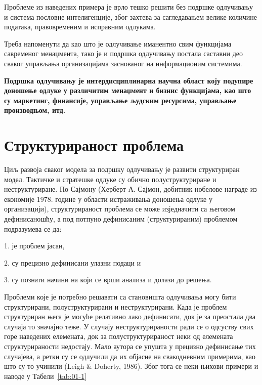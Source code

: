Проблеме из наведених примера је врло тешко решити без подршке одлучивању и система пословне интелигенције, због захтева за сагледавањем велике количине података, правовременим и исправним одлукама.

Треба напоменути да као што је одлучивање иманентно свим функцијама савременог менаџмента, тако је и подршка одлучивању постала саставни део сваког управљања организацијама заснованог на информационим системима.

\textbf{Подршка одлучивању је интердисциплинарна научна област коју подупире доношење одлуке у различитим менаџмент и бизнис функцијама, као што су маркетинг, финансије, управљање људским ресурсима, управљање производњом, итд.}

\section{Структурираност проблема}
Циљ развоја сваког модела за подршку одлучивању је развити структуриран модел. Тактичке и стратешке одлуке су обично полуструктуриране и неструктуриране. По Сајмону (Херберт А. Сајмон, добитник нобелове награде из економије 1978. године у области истраживања доношења одлуке у организацији), структурираност проблема се може изједначити са његовом дефинисаношћу, а под потпуно дефинисаним (структурираним) проблемом подразумева се да:

1. је проблем јасан,

2. су прецизно дефинисани улазни подаци и

3. су познати начини на који се врши анализа и долази до решења.

Проблеми које је потребно решавати са становишта одлучивања могу бити структурирани, полуструктурирани и неструктурирани. Када је проблем структуриран њега је могуће релативно лако дефинисати, док је за преостала два случаја то значајно теже. У случају неструктурираности ради се о одсуству свих горе наведених елемената, док за полуструктурираност неки од елемената структурираности недостају. Мало аутора се упушта у прецизно дефинисање тих случајева, а ретки су се одлучили да их објасне на свакодневним примерима, као што су то учинили (Leigh \& Doherty, 1986). Због тога се неки њихови примери и наводе у Табели~\ref{tab:01-1}

